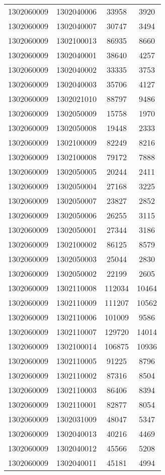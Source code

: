 \begin{longtable}[h]{llcc}
		1302060009 & 1302040006 & 33958 & 3920\\
		1302060009 & 1302040007 & 30747 & 3494\\
		1302060009 & 1302100013 & 86935 & 8660\\
		1302060009 & 1302040001 & 38640 & 4257\\
		1302060009 & 1302040002 & 33335 & 3753\\
		1302060009 & 1302040003 & 35706 & 4127\\
		1302060009 & 1302021010 & 88797 & 9486\\
		1302060009 & 1302050009 & 15758 & 1970\\
		1302060009 & 1302050008 & 19448 & 2333\\
		1302060009 & 1302100009 & 82249 & 8216\\
		1302060009 & 1302100008 & 79172 & 7888\\
		1302060009 & 1302050005 & 20244 & 2411\\
		1302060009 & 1302050004 & 27168 & 3225\\
		1302060009 & 1302050007 & 23827 & 2852\\
		1302060009 & 1302050006 & 26255 & 3115\\
		1302060009 & 1302050001 & 27344 & 3186\\
		1302060009 & 1302100002 & 86125 & 8579\\
		1302060009 & 1302050003 & 25044 & 2830\\
		1302060009 & 1302050002 & 22199 & 2605\\
		1302060009 & 1302110008 & 112034 & 10464\\
		1302060009 & 1302110009 & 111207 & 10562\\
		1302060009 & 1302110006 & 101009 & 9586\\
		1302060009 & 1302110007 & 129720 & 14014\\
		1302060009 & 1302100014 & 106875 & 10936\\
		1302060009 & 1302110005 & 91225 & 8796\\
		1302060009 & 1302110002 & 87316 & 8504\\
		1302060009 & 1302110003 & 86406 & 8394\\
		1302060009 & 1302110001 & 82877 & 8054\\
		1302060009 & 1302031009 & 48047 & 5347\\
		1302060009 & 1302040013 & 40216 & 4469\\
		1302060009 & 1302040012 & 45566 & 5208\\
		1302060009 & 1302040011 & 45181 & 4994\\

\end{longtable}
